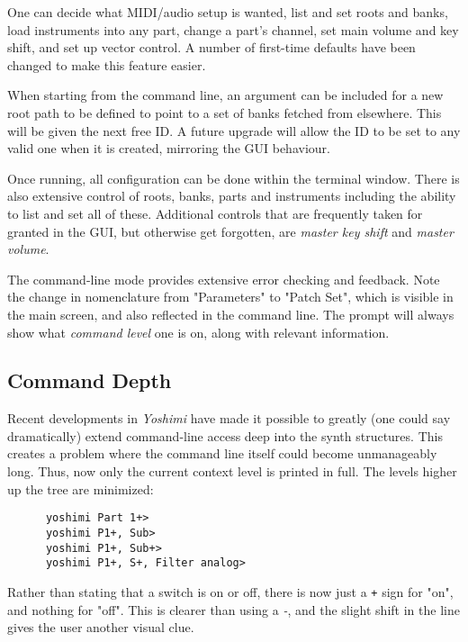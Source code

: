    One can decide what MIDI/audio setup is wanted, list and set roots and
   banks, load instruments into any part, change a part's channel, set main
   volume and key shift, and set up vector control.  A number of first-time
   defaults have been changed to make this feature easier.

   When starting from the command line, an argument can be included for a new
   root path to be defined to point to a set of banks fetched from elsewhere.
   This will be given the next free ID. A future upgrade will allow the ID to
   be set to any valid one when it is created, mirroring the GUI behaviour.

   Once running, all configuration can be done within the terminal
   window.  There is also extensive control of roots, banks, parts and
   instruments including the ability to list and set all of these.
   Additional controls that are frequently taken for granted in the GUI, but
   otherwise get forgotten, are \textsl{master key shift} and \textsl{master
   volume}.


   The command-line mode provides extensive error checking and feedback.
   Note the change in nomenclature from "Parameters" to "Patch Set", which is
   visible in the main screen, and also reflected in the command line.
   The prompt will always show what \textsl{command level}
   one is on, along with relevant information.

   \subsection{Command Depth}
\label{subsec:command_line_command_depth}

   Recent developments in \textsl{Yoshimi} have made it possible to greatly
   (one could say dramatically) extend command-line access deep into
   the synth structures.
   This creates a problem where the command line itself could become
   unmanageably long.
   Thus, now only the current context level is printed in full.
   The levels higher up the tree are minimized:

   \begin{verbatim}
      yoshimi Part 1+>
      yoshimi P1+, Sub>
      yoshimi P1+, Sub+>
      yoshimi P1+, S+, Filter analog>
   \end{verbatim}

   Rather than stating that a switch is on or off,
   there is now just a \texttt{+} sign for "on", and nothing for "off".
   This is clearer than using a \textsl{-}, and the
   slight shift in the line gives the user another visual clue.

